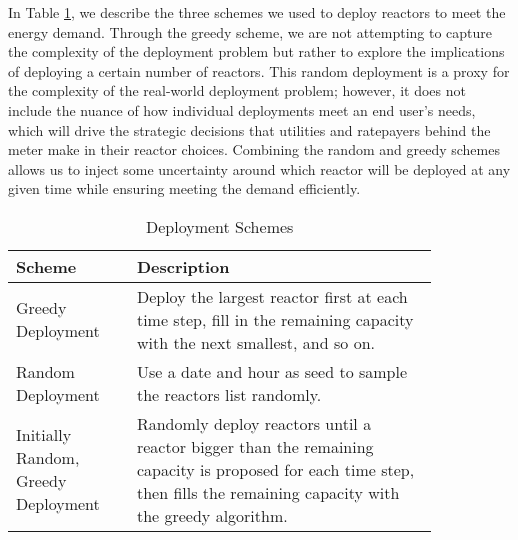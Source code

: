 \documentclass{anstrans}
\begin{document}
In Table \ref{tab:deployment_schemes}, we describe the three schemes we used to deploy reactors to meet the energy demand. Through the greedy scheme, we are not attempting to capture the complexity of the deployment problem but rather to explore the implications of deploying a certain number of reactors. This random deployment is a proxy for the complexity of the real-world deployment problem; however, it does not include the nuance of how individual deployments meet an end user's needs, which will drive the strategic decisions that utilities and ratepayers behind the meter make in their reactor choices. Combining the random and greedy schemes allows us to inject some uncertainty around which reactor will be deployed at any given time while ensuring meeting the demand efficiently.

\begin{table}[h]
  \centering
  \caption{Deployment Schemes}
  \label{tab:deployment_schemes}
  \begin{tabular}{>{\raggedright}p{0.24\linewidth}>{\raggedright\arraybackslash}p{0.60\linewidth}}
      \hline
      Scheme & Description \\
      \hline
      Greedy Deployment & Deploy the largest
      reactor first at each time step, fill in the remaining capacity with
      the next smallest, and so on. \\
      Random Deployment & Use a date and hour as seed to sample the
      reactors list randomly. \\
      Initially Random, Greedy Deployment & Randomly deploy reactors until
      a reactor bigger than the remaining capacity is proposed for each time step,
      then fills the remaining capacity with the greedy algorithm. \\
      \hline
  \end{tabular}
\end{table}


\end{document}
